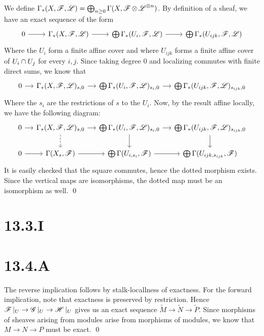 \documentclass{article}
\begin{document}
We define $\Gamma_*(X, \operatorname{\mathscr{F}}, \operatorname{\mathscr{L}}) = \bigoplus_{n\geq 0}\Gamma(X, \operatorname{\mathscr{F}} \otimes \operatorname{\mathscr{L}}^{\otimes n})$. By definition of a sheaf, we have an exact
sequence of the form \[\begin{tikzcd}
        0 & {\Gamma_*(X, \mathscr{F}, \mathscr{L})} & {\bigoplus \Gamma_*(U_i, \mathscr{F}, \mathscr{L})} & {\bigoplus \Gamma_*(U_{ijk}, \mathscr{F}, \mathscr{L})}
        \arrow[from=1-1, to=1-2]
        \arrow[from=1-2, to=1-3]
        \arrow[from=1-3, to=1-4]
    \end{tikzcd}\] Where the $U_i$
form a finite affine cover and where $U_{ijk}$ forms a finite
affine cover of $U_i \cap U_j$ for every $i,j$.
Since taking degree 0 and localizing commutes with finite direct sums, we know
that   \[\begin{tikzcd}[column sep=small]
        0 & {\Gamma_*(X, \mathscr{F}, \mathscr{L})_{s,0}} & {\bigoplus \Gamma_*(U_i, \mathscr{F}, \mathscr{L})_{s_i,0}} & {\bigoplus \Gamma_*(U_{ijk}, \mathscr{F}, \mathscr{L})_{s_{ijk},0}}
        \arrow[from=1-1, to=1-2]
        \arrow[from=1-2, to=1-3]
        \arrow[from=1-3, to=1-4]
    \end{tikzcd}\] Where the $s_i$ are the
restrictions of $s$ to the $U_i$. Now, by
the result affine locally, we have the following diagram:
\[\begin{tikzcd}[column sep=small]
        0 & {\Gamma_*(X, \mathscr{F}, \mathscr{L})_{s,0}} & {\bigoplus \Gamma_*(U_i, \mathscr{F}, \mathscr{L})_{s_i,0}} & {\bigoplus \Gamma_*(U_{ijk}, \mathscr{F}, \mathscr{L})_{s_{ijk},0}} \\
        0 & {\Gamma(X_s, \mathscr{F})}                    & {\bigoplus\Gamma(U_{i,s_i}, \mathscr{F})}                   & {\bigoplus\Gamma(U_{ijk,s_{ijk}}, \mathscr{F})}
        \arrow[from=2-1, to=2-2]
        \arrow[from=2-2, to=2-3]
        \arrow[from=2-3, to=2-4]
        \arrow[from=1-1, to=1-2]
        \arrow[from=1-2, to=1-3]
        \arrow[from=1-3, to=1-4]
        \arrow[from=1-3, to=2-3]
        \arrow[from=1-4, to=2-4]
        \arrow[dashed, from=1-2, to=2-2]
    \end{tikzcd}\] It is easily checked that the square commutes, hence
the dotted morphism exists. Since the vertical maps are isomorphisms, the
dotted map must be an isomorphism as well. \qed

\section*{13.3.I}

\section*{13.4.A}
The reverse implication follows by stalk-locallness of exactness. For the
forward implication, note that exactness is preserved by restriction. Hence
$\operatorname{\mathscr{F}}|_{U} \to \operatorname{\mathscr{G}}|_{U} \to \operatorname{\mathscr{H}}|_{U}$ gives us an exact sequence $\widetilde{M} \to \widetilde{N} \to \widetilde{P}$.
Since morphisms of sheaves arising from modules arise from morphisms of
modules, we know that $M \to N \to P$ must be exact. \qed
\end{document}
